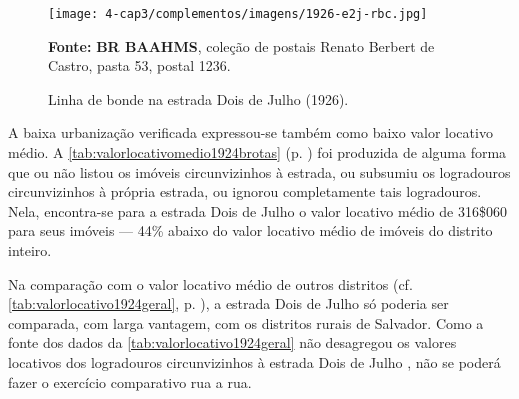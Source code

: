 \begin{figure}[!h]
\centering
\caption{Linha de bonde na estrada Dois de Julho (1926).}
\texttt{[image: 4-cap3/complementos/imagens/1926-e2j-rbc.jpg]}{\footnotesize \par \textbf{Fonte:} \textbf{BR BAAHMS}, coleção de postais Renato Berbert de Castro, pasta 53, postal 1236.}
\label{fig:1926-e2j-rbc}
\end{figure}


A baixa urbanização verificada expressou-se também como baixo valor locativo médio. A \autoref{tab:valorlocativomedio1924brotas} (p. \pageref{tab:valorlocativomedio1924brotas}) foi produzida de alguma forma que ou não listou os imóveis circunvizinhos à estrada, ou subsumiu os logradouros circunvizinhos à própria estrada, ou ignorou completamente tais logradouros. Nela, encontra-se para a estrada Dois de Julho o valor locativo médio de 316\$060 para seus imóveis --- 44\% abaixo do valor locativo médio de imóveis do distrito inteiro.

Na comparação com o valor locativo médio de outros distritos (cf. \autoref{tab:valorlocativo1924geral}, p. \pageref{tab:valorlocativo1924geral}), a estrada Dois de Julho só poderia ser comparada, com larga vantagem, com os distritos rurais de Salvador. Como a fonte dos dados da \autoref{tab:valorlocativo1924geral} não desagregou os valores locativos dos logradouros circunvizinhos à estrada Dois de Julho \cite{bahia_annuario_1926}, não se poderá fazer o exercício comparativo rua a rua.








